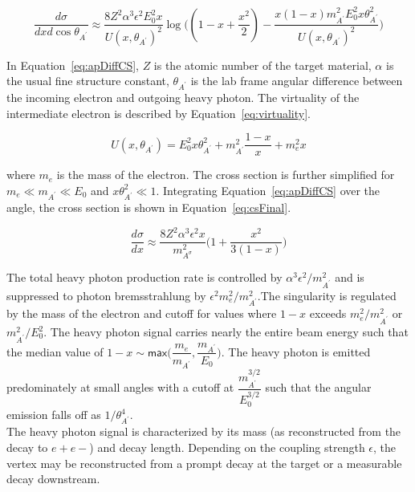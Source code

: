 \begin{equation}
	\label{eq:apDiffCS}
	\dfrac{d\sigma}{dxd\cos\theta_{A^{\prime}}} \approx \dfrac{8Z^2\alpha^3\epsilon^2E_0^2x}{U(x,\theta_{A^{\prime}})^2}\log\Big( (1-x+\dfrac{x^2}{2})-\dfrac{x(1-x)m_{A^{\prime}}^2E_0^2x\theta_{A^{\prime}}^2}{U(x,\theta_{A^{\prime}})^2}\Big)
\end{equation}

In Equation~\eqref{eq:apDiffCS}, $Z$ is the atomic number of the target material, $\alpha$ is the usual fine structure constant, $\theta_{A^{\prime}}$ is the lab frame angular difference between the incoming electron and outgoing heavy photon. The virtuality of the intermediate electron is described by Equation~\eqref{eq:virtuality}.

\begin{equation}
	\label{eq:virtuality}
	U(x,\theta_{A^{\prime}}) = E_0^2x\theta_{A^{\prime}}^2+m_{A^{\prime}}^2\dfrac{1-x}{x}+m_e^2x 
\end{equation}

where $m_e$ is the mass of the electron. The cross section is further simplified for $m_e\ll m_{A^{\prime}}\ll E_0$ and $x\theta_{A^{\prime}}^2\ll 1$. Integrating Equation~\eqref{eq:apDiffCS} over the angle, the cross section is shown in Equation~\eqref{eq:csFinal}.

\begin{equation}
	\label{eq:csFinal}
	\dfrac{d\sigma}{dx} \approx \dfrac{8Z^2\alpha^3\epsilon^2x}{m_{A^{\sigma}}^2}\Big(1+\dfrac{x^2}{3(1-x)}\Big)
\end{equation}

The total heavy photon production rate is controlled by $\alpha^3\epsilon^2/m_{A^{\prime}}^2$ and is suppressed to photon bremsstrahlung by $\epsilon^2m_e^2/m_{A^{\prime}}^2$.The singularity is regulated by the mass of the electron and cutoff for values where $1-x$ exceeds $m_e^2/m_{A^{\prime}}^2$ or $m_{A^{\prime}}^2/E_0^2$. The heavy photon signal carries nearly the entire beam energy such that the median value of $1-x\sim\textsf{max}\Big(\dfrac{m_e}{m_{A^{\prime}}}, \dfrac{m_{A^{\prime}}}{E_0}\Big)$. The heavy photon is emitted predominately at small angles with a cutoff at $\dfrac{m_{A^{\prime}}^{3/2}}{E_0^{3/2}}$ such that the angular emission falls off as $1/\theta_{A^{\prime}}^4$.\\
 \indent The heavy photon signal is characterized by its mass (as reconstructed from the decay to $e+e-$) and decay length. Depending on the coupling strength $\epsilon$, the vertex may be reconstructed from a prompt decay at the target or a measurable decay downstream.  

